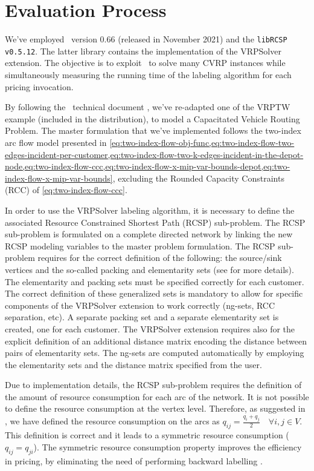 \section{Evaluation Process}
\label{sec:results-evaluation-process}

We've employed \bapcod\ version 0.66 (released in November 2021) and the \texttt{libRCSP v0.5.12}.
The latter library contains the implementation of the VRPSolver extension.
The objective is to exploit \bapcod\ to solve many CVRP instances while simultaneously
measuring the running time of the labeling algorithm for each pricing invocation.

\medskip

By following the \bapcod\ technical document \parencite{sadykov2021},
we've re-adapted one of the VRPTW example (included in the distribution),
to model a Capacitated Vehicle Routing Problem.
The master formulation that we've implemented follows the two-index arc flow model
presented in \cref{eq:two-index-flow-obj-func,eq:two-index-flow-two-edges-incident-per-customer,eq:two-index-flow-two-k-edges-incident-in-the-depot-node,eq:two-index-flow-ccc,eq:two-index-flow-x-mip-var-bounds-depot,eq:two-index-flow-x-mip-var-bounds},
excluding the Rounded Capacity Constraints (RCC) of \cref{eq:two-index-flow-ccc}.

In order to use the VRPSolver labeling algorithm, it is necessary
to define the associated Resource Constrained Shortest Path (RCSP) sub-problem.
The RCSP sub-problem is formulated on a complete directed network by
linking the new RCSP modeling variables to the master problem formulation.
The RCSP sub-problem requires for the correct definition of the following:
the source/sink vertices and the so-called packing and elementarity sets (see \cite{pessoa2020a} for more details).
The elementarity and packing sets must be specified correctly for each customer.
The correct definition of these generalized sets is mandatory to allow for specific
components of the VRPSolver extension to work correctly (ng-sets, RCC separation, etc).
A separate packing set and a separate elementarity set is created, one for each customer.
The VRPSolver extension requires also for the explicit definition of an additional
distance matrix encoding the distance between pairs of elementarity sets.
The ng-sets are computed automatically by employing the elementarity sets
and the distance matrix specified from the user.

Due to implementation details, the RCSP sub-problem requires
the definition of the amount of resource consumption for each arc of the network.
It is not possible to define the resource consumption at the vertex level.
Therefore, as suggested in \textcite{pessoa2020a}, we have defined the resource consumption
on the arcs as $q_{ij} = \frac{q_{i} + q_{j}}{2} \quad \forall i, j \in V$.
This definition is correct and it leads to a symmetric resource consumption ($q_{ij} = q_{ji}$).
The symmetric resource consumption property improves the efficiency in pricing,
by eliminating the need of performing backward labelling \parencite{pessoa2020a}.

